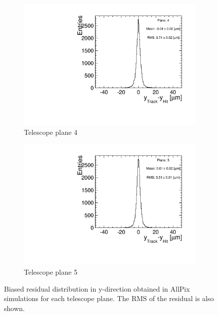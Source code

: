 \begin{figure}[htbp]
\begin{subfigure}[b]{0.3\textwidth}
    \includegraphics[width=\textwidth]{figures/Telescope/biasedResiduals/BiasedResiduals_run77_PlaneYRMS4.pdf}
    \caption{Telescope plane 4}
  \end{subfigure}\hfill
  \begin{subfigure}[b]{0.3\textwidth}
    \includegraphics[width=\textwidth]{figures/Telescope/biasedResiduals/BiasedResiduals_run77_PlaneYRMS5.pdf}
    \caption{Telescope plane 5}
  \end{subfigure}
  \caption{Biased residual distribution in y-direction obtained in
    AllPix simulations for each telescope plane. The RMS of the
    residual is also shown.}
  \label{fig:telescope_biasedResiduals_simu_Y}
\end{figure}
